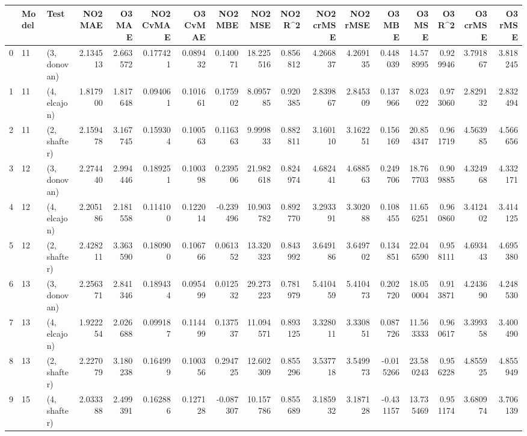 \begin{tabular}{lllrrrrrrrrrrrrrr}
\toprule
{} & Model &          Test &   NO2 MAE &    O3 MAE &  NO2 CvMAE &  O3 CvMAE &   NO2 MBE &     NO2 MSE &   NO2 R\textasciicircum2 &  NO2 crMSE &   NO2 rMSE &    O3 MBE &      O3 MSE &    O3 R\textasciicircum2 &   O3 crMSE &    O3 rMSE \\
\midrule
0  &    11 &  (3, donovan) &  2.134513 &  2.663572 &   0.177421 &  0.089432 &  0.140071 &   18.225516 &  0.856812 &   4.266837 &   4.269135 &  0.448039 &   14.578995 &  0.929946 &   3.791867 &   3.818245 \\
1  &    11 &  (4, elcajon) &  1.817900 &  1.817648 &   0.094061 &  0.101661 &  0.175902 &    8.095785 &  0.920385 &   2.839867 &   2.845309 &  0.137966 &    8.023022 &  0.973060 &   2.829132 &   2.832494 \\
2  &    11 &  (2, shafter) &  2.159478 &  3.167745 &   0.159304 &  0.100563 &  0.116363 &    9.999833 &  0.882811 &   3.160110 &   3.162251 &  0.156169 &   20.854347 &  0.961719 &   4.563985 &   4.566656 \\
3  &    12 &  (3, donovan) &  2.274440 &  2.994446 &   0.189251 &  0.100398 &  0.239506 &   21.982618 &  0.824974 &   4.682441 &   4.688563 &  0.249706 &   18.767703 &  0.909885 &   4.324968 &   4.332171 \\
4  &    12 &  (4, elcajon) &  2.205186 &  2.181558 &   0.114100 &  0.122014 & -0.239496 &   10.903782 &  0.892770 &   3.293391 &   3.302088 &  0.108455 &   11.656251 &  0.960860 &   3.412402 &   3.414125 \\
5  &    12 &  (2, shafter) &  2.428211 &  3.363590 &   0.180900 &  0.106766 &  0.061352 &   13.320323 &  0.843992 &   3.649186 &   3.649702 &  0.134851 &   22.046590 &  0.958111 &   4.693443 &   4.695380 \\
6  &    13 &  (3, donovan) &  2.256371 &  2.841346 &   0.189434 &  0.095499 &  0.012532 &   29.273223 &  0.781979 &   5.410459 &   5.410473 &  0.202720 &   18.050004 &  0.913871 &   4.243690 &   4.248530 \\
7  &    13 &  (4, elcajon) &  1.922254 &  2.026688 &   0.099187 &  0.114499 &  0.137537 &   11.094571 &  0.893125 &   3.328011 &   3.330851 &  0.087726 &   11.563333 &  0.960617 &   3.399358 &   3.400490 \\
8  &    13 &  (2, shafter) &  2.227079 &  3.180238 &   0.164999 &  0.100356 &  0.294725 &   12.602309 &  0.855296 &   3.537718 &   3.549973 & -0.015266 &   23.580243 &  0.956228 &   4.855925 &   4.855949 \\
9  &    15 &  (4, shafter) &  2.033388 &  2.499391 &   0.162886 &  0.127128 & -0.087307 &   10.157786 &  0.855689 &   3.185932 &   3.187128 & -0.431157 &   13.735469 &  0.951174 &   3.680974 &   3.706139 \\

\end{tabular}
